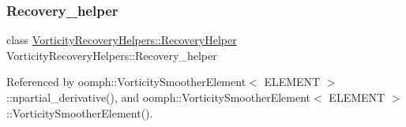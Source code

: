 \subsubsection{\texorpdfstring{Recovery\+\_\+helper}{Recovery\_helper}}
{\footnotesize\ttfamily class \hyperlink{classVorticityRecoveryHelpers_1_1RecoveryHelper}{Vorticity\+Recovery\+Helpers\+::\+Recovery\+Helper}  Vorticity\+Recovery\+Helpers\+::\+Recovery\+\_\+helper}



Referenced by oomph\+::\+Vorticity\+Smoother\+Element$<$ E\+L\+E\+M\+E\+N\+T $>$\+::npartial\+\_\+derivative(), and oomph\+::\+Vorticity\+Smoother\+Element$<$ E\+L\+E\+M\+E\+N\+T $>$\+::\+Vorticity\+Smoother\+Element().

